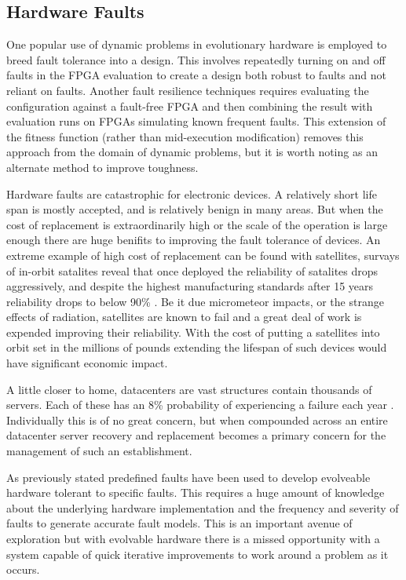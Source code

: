 \subsection{Hardware Faults}
One popular use of dynamic problems in evolutionary hardware is employed to breed
fault tolerance into a
design. This involves repeatedly turning on and off faults in the FPGA evaluation to
create a design both robust to faults and not reliant on faults. Another fault resilience
techniques requires evaluating the configuration
against a fault-free FPGA and then combining the result with evaluation runs on FPGAs
simulating known frequent faults. This extension of the fitness function (rather than
mid-execution modification) removes this approach from the domain of dynamic problems,
but it is worth noting as an alternate method to improve toughness.

Hardware faults are catastrophic for electronic devices. A relatively short life span is
mostly accepted, and is relatively benign in many areas. But when the cost of replacement is
extraordinarily high or the scale of the operation is large enough there are huge benifits
to improving the fault tolerance of devices. An extreme example of high cost of replacement
can be found with satellites, survays of in-orbit satalites reveal that once deployed the
reliability of satalites drops aggressively, and despite the highest manufacturing standards
after 15 years reliability drops to below
90\% \cite{CASTET20091718}. Be it due micrometeor impacts,
or the strange effects of radiation, satellites are known to fail and a great deal of
work is expended improving their reliability. With the cost
of putting a satellites into orbit set in the millions of pounds extending the lifespan
of such devices would have significant economic impact.

A little closer to home, datacenters are vast structures contain thousands of servers.
Each of these has an 8\% probability of experiencing a failure each year
 \cite{Vishwanath:2010:CCC:1807128.1807161}.
Individually this is of no great concern, but when compounded across an entire datacenter
server recovery and replacement becomes a primary concern for the management of
such an establishment.

As previously stated predefined faults have been used to
develop evolveable hardware tolerant to specific faults. This requires a huge amount of knowledge
about the underlying hardware implementation and the frequency and severity of faults to generate
accurate fault models. This
is an important avenue of exploration but with evolvable hardware there is a missed
opportunity with a system capable of quick iterative improvements to work around
a problem as it occurs. 

